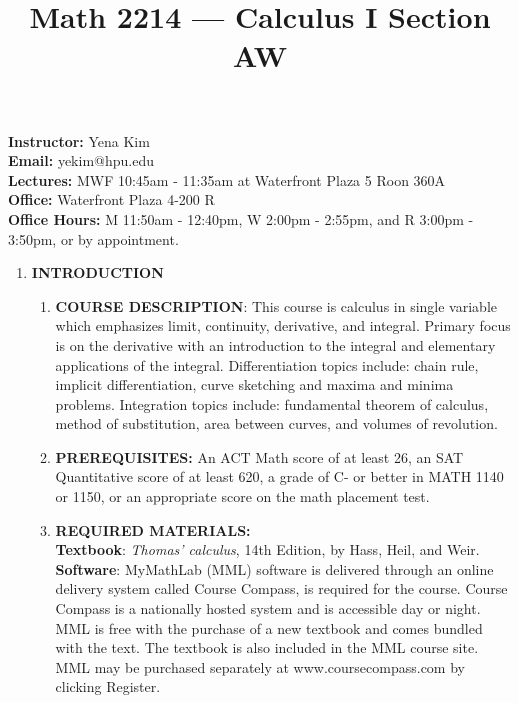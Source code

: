 \documentclass[12pt]{amsart}
\title{Math 2214 --- Calculus I Section AW}
\begin{document}
\maketitle

\vspace{-7mm}

{\bf Instructor:} Yena Kim \\
{\bf Email:} yekim@hpu.edu    \\
{\bf Lectures:}  MWF 10:45am - 11:35am at Waterfront Plaza 5 Roon 360A 	\\
{\bf Office:}  Waterfront Plaza 4-200 R	\\
{\bf Office Hours:} M 11:50am - 12:40pm, W 2:00pm - 2:55pm, and R 3:00pm - 3:50pm, or by appointment.\\


\begin {enumerate}
\item {\bf INTRODUCTION}\\
\begin {enumerate}
\item {\bf COURSE DESCRIPTION}: This course is calculus in single variable which emphasizes limit, continuity, derivative, and integral. Primary focus is on the derivative with an introduction to the integral and elementary applications of the integral. Differentiation topics include: chain rule, implicit differentiation, curve sketching and maxima and minima problems. Integration topics include: fundamental theorem of calculus, method of substitution, area between curves, and volumes of revolution. \\
\item {\bf PREREQUISITES:}
An ACT Math score of at least 26, an SAT Quantitative score of at least 620, a grade of C- or better in MATH 1140 or 1150, or an appropriate score on the math placement test.\\ 
\item {\bf REQUIRED MATERIALS:}\\
 {\bf Textbook}: \emph{Thomas' calculus}, 14th Edition, by Hass, Heil, and Weir.\\
 {\bf Software}: MyMathLab (MML) software is delivered through an online delivery system called Course Compass, is required for the course. Course Compass is a nationally hosted system and is accessible day or night. MML is free with the purchase of a new textbook and comes bundled with the text. The textbook is also included in the MML course site. MML may be purchased separately at www.coursecompass.com by clicking Register. \\

\end{enumerate}
\end{enumerate}
\end{document}
